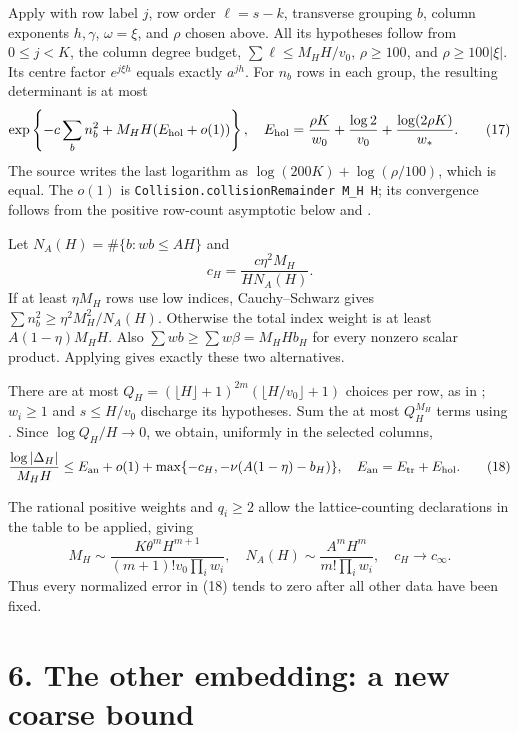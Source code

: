 \documentclass[11pt]{article}
\begin{document}
Apply  with row label \(j\), row
order \(\ell=s-k\), transverse grouping \(b\), column exponents
\(h,\gamma\), \(\omega=\xi\), and \(\rho\) chosen above. All its
hypotheses follow from \(0\le j<K\), the column degree budget,
\(\sum\ell\le M_HH/v_0\), \(\rho\ge100\), and \(\rho\ge100|\xi|\). Its
centre factor \(e^{j\xi h}\) equals exactly \(a^{jh}\). For \(n_b\) rows
in each group, the resulting determinant is at most \[
\exp\left\{-c\sum_bn_b^2+M_HH(E_{\rm hol}+o(1))\right\},
\quad E_{\rm hol}=\frac{\rho K}{w_0}+\frac{\log2}{v_0}
+\frac{\log(2\rho K)}{w_*}.                         \tag{17}
\] The source writes the last logarithm as
\(\log(200K)+\log(\rho/100)\), which is equal. The \(o(1)\) is
\texttt{Collision.collisionRemainder M\_H H}; its convergence follows
from the positive row-count asymptotic below and
.

Let \(N_A(H)=\#\{b:wb\le AH\}\) and \[
c_H=\frac{c\eta^2M_H}{H N_A(H)}.
\] If at least \(\eta M_H\) rows use low indices, Cauchy--Schwarz gives
\(\sum n_b^2\ge\eta^2M_H^2/N_A(H)\). Otherwise the total index weight is
at least \(A(1-\eta)M_HH\). Also \(\sum wb\ge\sum w\beta=M_HHb_H\) for
every nonzero scalar product. Applying 
gives exactly these two alternatives.

There are at most
\(Q_H=(\lfloor H\rfloor+1)^{2m}(\lfloor H/v_0\rfloor+1)\) choices per
row, as in ; \(w_i\ge1\) and
\(s\le H/v_0\) discharge its hypotheses. Sum the at most \(Q_H^{M_H}\)
terms using . Since \(\log Q_H/H\to0\), we obtain,
uniformly in the selected columns, \[
\frac{\log|\Delta_H|}{M_HH}\le
E_{\rm an}+o(1)+\max\{-c_H,-\nu(A(1-\eta)-b_H)\},
\quad E_{\rm an}=E_{\rm tr}+E_{\rm hol}.             \tag{18}
\]

The rational positive weights and \(q_i\ge2\) allow the lattice-counting
declarations in the table to be applied, giving \[
M_H\sim\frac{K\theta^mH^{m+1}}{(m+1)!v_0\prod_iw_i},
\quad N_A(H)\sim\frac{A^mH^m}{m!\prod_iw_i},
\quad c_H\longrightarrow c_\infty.                 \tag{19}
\] Thus every normalized error in (18) tends to zero after all other
data have been fixed.

\section{6. The other embedding: a new coarse
bound}\label{the-other-embedding-a-new-coarse-bound}
\end{document}
